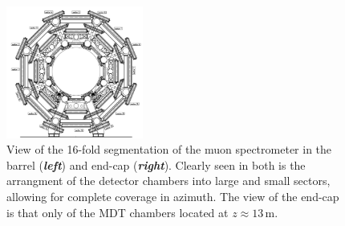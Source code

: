\begin{figure}[!htb]
    \begin{center}
        \includegraphics[width=0.4\textwidth]{figures/chapter2/muon_spec/atlas_muon_barrel}
        \caption{
            View of the 16-fold segmentation of the muon spectrometer in the barrel (\textbf{\textit{left}})
            and end-cap (\textbf{\textit{right}}).
            Clearly seen in both is the arrangment of the detector chambers into large and
            small sectors, allowing for complete coverage in azimuth.
            The view of the end-cap is that only of the MDT chambers located at $z\approx13$\,m.
        }
        \label{fig:muon_segmentation}
    \end{center}
\end{figure}

